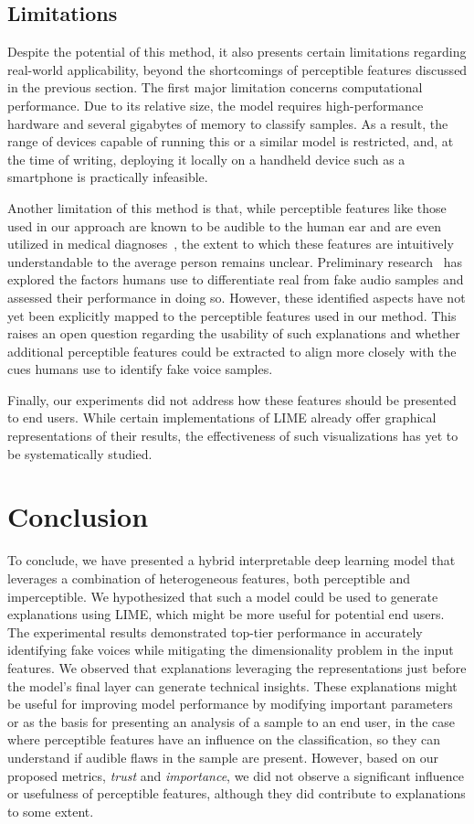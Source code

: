 \documentclass{article}
\begin{document}
\subsection{Limitations}
Despite the potential of this method, it also presents certain limitations regarding real-world applicability, beyond the shortcomings of perceptible features discussed in the previous section. The first major limitation concerns computational performance. Due to its relative size, the model requires high-performance hardware and several gigabytes of memory to classify samples. As a result, the range of devices capable of running this or a similar model is restricted, and, at the time of writing, deploying it locally on a handheld device such as a smartphone is practically infeasible.

Another limitation of this method is that, while perceptible features like those used in our approach are known to be audible to the human ear and are even utilized in medical diagnoses~\cite{chaiwongyen_deepfake-speech_2023}, the extent to which these features are intuitively understandable to the average person remains unclear. Preliminary research~\cite{warren_better_2024,sharevski_blind_2024} has explored the factors humans use to differentiate real from fake audio samples and assessed their performance in doing so. However, these identified aspects have not yet been explicitly mapped to the perceptible features used in our method. This raises an open question regarding the usability of such explanations and whether additional perceptible features could be extracted to align more closely with the cues humans use to identify fake voice samples.

Finally, our experiments did not address how these features should be presented to end users. While certain implementations of LIME already offer graphical representations of their results, the effectiveness of such visualizations has yet to be systematically studied.

\section{Conclusion}
To conclude, we have presented a hybrid interpretable deep learning model that leverages a combination of heterogeneous features, both perceptible and imperceptible. We hypothesized that such a model could be used to generate explanations using LIME, which might be more useful for potential end users. The experimental results demonstrated top-tier performance in accurately identifying fake voices while mitigating the dimensionality problem in the input features. We observed that explanations leveraging the representations just before the model’s final layer can generate technical insights. These explanations might be useful for improving model performance by modifying important parameters or as the basis for presenting an analysis of a sample to an end user, in the case where perceptible features have an influence on the classification, so they can understand if audible flaws in the sample are present. However, based on our proposed metrics, \textit{trust} and \textit{importance}, we did not observe a significant influence or usefulness of perceptible features, although they did contribute to explanations to some extent.
\end{document}
